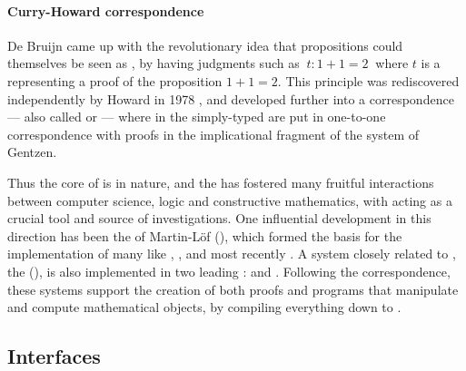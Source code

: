 \paragraph{Curry-Howard correspondence}

\AP
De Bruijn came up with the revolutionary idea that propositions could themselves
be seen as , by having judgments such as $~t : 1 + 1 = 2~$ where $t$
is a  representing a proof of the proposition $1 + 1 = 2$.
This  principle was rediscovered independently by
Howard in 1978 , and developed further into a
 correspondence --- also called  or  --- where  in the simply-typed
 are put in one-to-one correspondence with proofs in the
implicational fragment of the  system  of Gentzen.

\AP Thus the core of  is \emph{} in nature,
and the  has fostered many fruitful interactions
between computer science, logic and constructive mathematics, with  acting as a crucial tool and source of investigations. One
influential development in this direction has been the  of Martin-Löf (), which formed the basis for the
implementation of many  like , ,
and most recently  \cite{geuvers_proof_2009}. A system closely
related to , the 
(), is also implemented in two leading :
  and 
. Following the 
correspondence, these systems support the creation of both proofs and programs
that manipulate and compute mathematical objects, by compiling everything down
to  .

\subsection{Interfaces}

